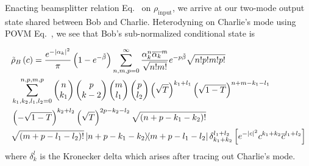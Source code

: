 \noindent Enacting beamsplitter relation Eq.~ on $\rho_{\text{input}}$, we arrive at our two-mode output state shared between Bob and Charlie.
Heterodyning on Charlie's mode using POVM Eq.~, we see that Bob's sub-normalized conditional state is


\begin{align}\label{eqn:qds_bs1_deriv_2}
%
&\tilde{\rho}_B\left(c\right) = \frac{e^{-\left|\alpha_k\right|^2}}{\pi}\left(1 - e^{-\tilde{\beta}}\right) \sum_{n, m, p=0}^\infty \frac{\alpha_k^n \overline{\alpha_k}^m}{\sqrt{n! m!}} e^{- p \tilde{\beta}} \sqrt{n! p! m! p!} \notag \\
%
&\sum_{k_1, k_2, l_1, l_2=0}^{n, p, m, p} \pmqty{n \\ k_1} \pmqty{p \\ k-2} \pmqty{m \\ l_1} \pmqty{p \\ l_2} \left(\sqrt{T}\right)^{k_1 + l_1} \left(\sqrt{1-T}\right)^{n + m - k_1 - l_1} \notag \\
%
&\left(-\sqrt{1-T}\right)^{k_2 + l_2} \left(\sqrt{T}\right)^{2 p - k_2 - l_2} \sqrt{\left(n + p - k_1 - k_2\right)!} \notag \\
%
&\sqrt{\left(m + p - l_1 - l_2\right)!} \dyad{n + p - k_1 - k_2}{m + p - l_1 - l_2} \delta_{k_1+k_2}^{l_1+l_2} \left[ e^{-\left|c\right|^2} c^{k_1 + k_2} \overline{c}^{l_1 + l_2} \right]
%
\end{align}
where $\delta_k^l$ is the Kronecker delta which arises after tracing out Charlie's mode.

